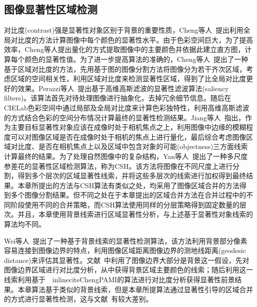\subsection{图像显著性区域检测}
\label{sec:SaliencyDetection}
对比度(contrast)强是显著性对象区别于背景的重要性质，Cheng等人~\cite{ChengPAMI}提出利用全局对比度的方法计算图像中每个颜色的显著性水平。由于色彩空间巨大，为了提高效率，Cheng等人提出量化的方式提取图像中的主要颜色并依据此建立直方图，计算每个颜色的显著性值。为了进一步提高算法的准确的，Cheng等人~\cite{ChengPAMI}提出了一种基于区域对比度的方法，先用基于图的图像分割方法将图像分为若干齐次区域，考虑区域的空间相关性，利用区域对比度来检测显著性区域，得到了比全局对比度更好的效果。Perazzi等人~\cite{saliencyFilter}提出基于高维高斯滤波的显著性滤波算法(saliency filters)。该算法首先对待处理图像进行抽象化，去掉冗余细节信息。随后在CIELab色彩空间中通过局部及全局对比度来计算色彩独特性，利用高维高斯滤波的方式结合色彩的空间分布情况计算最终的显著性检测结果。Jiang等人~\cite{ufo}指出，作为主要目标显著性对象应该在成像时处于相机焦点之上，利用图像中边缘的模糊程度可以对图像区域是否在成像时处于相机的焦点上进行量化，最后综合考虑图像区域对比度、是否在相机焦点上以及区域中包含对象的可能(objectness)三方面线索计算最终的结果。为了处理自然图像中的复杂结构，Yan等人~\cite{ECSSD}提出了一种多尺度参差花的显著性区域检测算法，称为CSH。该方法将图像在不同尺度上进行分割，得到多个层次的区域显著性线索，并将这些多层次的线索进行加权得到最终结果。本章所提出的方法与CSH算法有类似之处，均采用了图像区域合并的方法得到多个图像分割结果。但不同之处在于本章提出的区域合并方法在合并过程中的不同阶段使用不同的合并策略，而CSH算法使用同样的分层策略得到固定数量的层次。并且，本章使用背景线索进行区域显著性分析，与上述基于显著性对象线索的算法均不同。\par
Wei等人~\cite{geodesicDistance}提出了一种基于背景线索的显著性检测算法，该方法利用背景部分像素容易连接到图像边界的特点，利用图像区域距离图像边界的测地线距离(geodesic distance)来评估其显著性。文献~中利用了图像边界大部分是背景这一假设，先对图像边界区域进行对比度分析，从中获得背景区域主要颜色的线索；随后利用这一线索利用基于~\ inlinecite{ChengPAMI}的算法进行对比度分析获得显著性前景结果。本章算法基于类似的背景线索，但是本章所提算法通过显著性引导的区域合并的方式进行显著性检测，这与文献~有较大差别。

